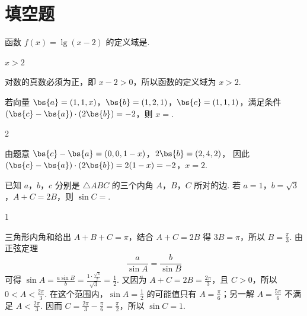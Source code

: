 \section{填空题}

\begin{problem}
函数 \( f(x)=\lg(x-2) \) 的定义域是\fillinblank{}.
\end{problem}

\begin{answer}
\(x>2\)
\end{answer}

\begin{solution}
对数的真数必须为正，即 \(x-2>0\)，所以函数的定义域为 \(x>2\).
\end{solution}

\begin{problem}
若向量 \(\bs{a} = (1, 1, x)\)，\(\bs{b} = (1, 2, 1)\)，\(\bs{c} = (1, 1, 1)\)，满足条件 \( (\bs{c} - \bs{a}) \cdot (2\bs{b}) = -2 \)，则 \(x=\)\fillinblank{}.
\end{problem}

\begin{answer}
2
\end{answer}

\begin{solution}
由题意
\(\bs{c}-\bs{a}=(0,0,1-x)\)，\(2\bs{b}=(2,4,2)\)，
因此
\((\bs{c}-\bs{a})\cdot(2\bs{b})=2(1-x)=-2\)，\(x=2\).
\end{solution}

\begin{problem}
已知 \(a\)，\(b\)，\(c\) 分别是 \(\triangle ABC\) 的三个内角 \(A\)，\(B\)，\(C\) 所对的边. 若 \(a = 1\)，\(b = \sqrt{3}\)，\(A + C = 2B\)，则 \(\sin C = \)\fillinblank{}.
\end{problem}

\begin{answer}
1
\end{answer}

\begin{solution}
三角形内角和给出 \(A+B+C=\pi\)，结合 \(A+C=2B\) 得 \(3B=\pi\)，所以 \(B=\frac\pi3\). 由正弦定理
\[
\frac{a}{\sin A}=\frac{b}{\sin B}
\]
可得 \(\sin A=\frac{a\sin B}{b}=\frac{1\cdot\frac{\sqrt3}{2}}{\sqrt3}=\frac12\). 又因为 \(A+C=2B=\frac{2\pi}{3}\)，且 \(C>0\)，所以 \(0<A<\frac{2\pi}{3}\). 在这个范围内，\(\sin A=\frac12\) 的可能值只有 \(A=\frac\pi6\)；另一解 \(A=\frac{5\pi}{6}\) 不满足 \(A<\frac{2\pi}{3}\). 因而 \(C=\frac{2\pi}{3}-\frac\pi6=\frac\pi2\)，所以 \(\sin C=1\).
\end{solution}

